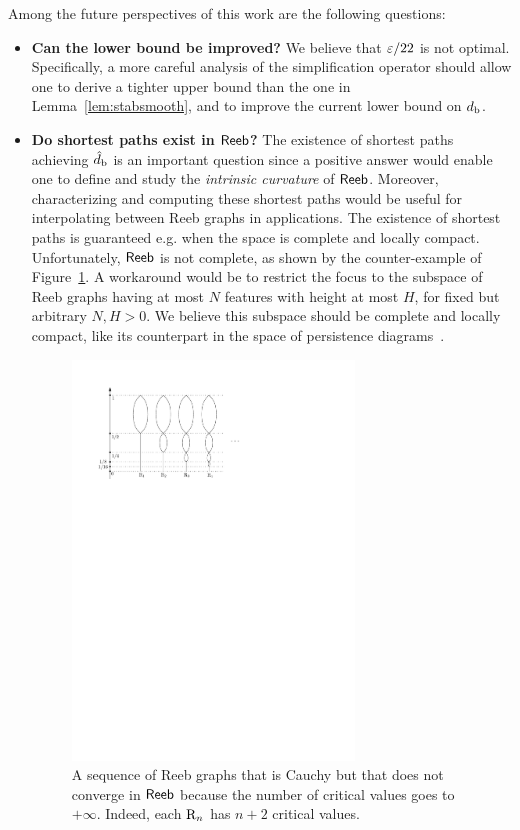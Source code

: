 Among the future perspectives of this work are the following questions:

\begin{itemize}

\item {\bf Can the lower bound be improved?} We believe that $\varepsilon/22$
  is not optimal.  Specifically, a more careful analysis of the
  simplification operator should allow one to derive a tighter upper
  bound than the one in Lemma~\ref{lem:stabsmooth}, and to 
  improve the current lower bound on $d_{\rm b}$.

\item {\bf Do shortest paths exist in ${\sf Reeb}$?} The existence of
  shortest paths achieving $\hat d_{\rm b}$ is an important question since a
  positive answer would enable one to define and study the {\em
    intrinsic curvature} of ${\sf Reeb}$.  Moreover, characterizing and
  computing these shortest paths would be useful for interpolating
  between Reeb graphs in applications.  The existence of shortest paths is guaranteed
  e.g. when the space is complete and locally compact.  Unfortunately, ${\sf Reeb}$ is
  not complete, as shown by the counter-example of
  Figure~\ref{fig:ce}. A workaround would be to restrict the focus to the
  subspace of Reeb graphs having at most $N$ features with height at
  most $H$, for fixed but arbitrary $N,H>0$. We believe this subspace
  should be complete and locally compact, like its counterpart in the space
  of persistence diagrams~\cite{Blumberg14}.

  \begin{figure}[htb]\centering
  \includegraphics[width=7.5cm]{figures/CounterExampleCauchy}
  \caption[The space of Reeb graphs is not Cauchy]{\label{fig:ce}
  A sequence of Reeb graphs that is Cauchy but that does not converge in ${\sf Reeb}$ because the number of critical values goes to $+\infty$.
  Indeed, each $\mathrm{R}_n$ has $n+2$ critical values.}
  \end{figure}


\end{itemize}
